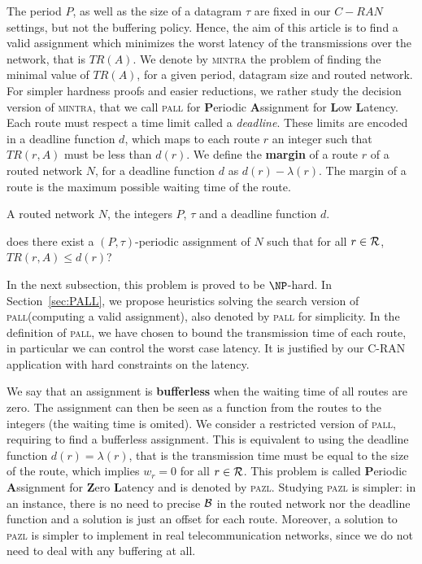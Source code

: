 \documentclass[a4paper,10pt]{article}
\newcommand\pazl{\textsc{pazl}\xspace}
\newcommand\pall{\textsc{pall}\xspace}
\newcommand\pra{\textsc{pra}\xspace}
\newcommand\mintra{\textsc{mintra}\xspace}
\begin{document}
      	The period $P$, as well as the size of a datagram $\tau$ are fixed in our $C-RAN$ settings, but not the buffering policy. Hence, the aim of this article is to find a valid assignment which minimizes the worst latency of the transmissions over the network, that is $TR(A)$. We denote by \mintra the problem of finding the minimal value of $TR(A)$, for a given period, datagram size and routed network.
      	For simpler hardness proofs and easier reductions, we rather study the decision version of \mintra, that we call \pall for \textbf{P}eriodic \textbf{A}ssignment for \textbf{L}ow \textbf{L}atency. Each route must respect a time limit called a \emph{deadline}. These limits are encoded in a deadline function $d$, which maps to each route $r$ an integer such that $TR(r,A)$ must be less than $d(r)$.
      	We define the \textbf{margin} of a route $r$ of a routed network $N$, for a deadline function $d$ as 
        $ d(r) - \lambda(r)$. The margin of a route is the maximum possible waiting time of the route.
         
     

        A routed network $N$, the integers $P$, $\tau$ and a deadline function $d$.
      
       does there exist a $(P,\tau)$-periodic assignment of $N$ such that for all $r \in {\cal R}$, $TR(r,A) \leq d(r)$?

	  In the next subsection, this problem is proved to be $\NP$-hard. In Section~\ref{sec:PALL}, we propose heuristics solving the search version of \pall (computing a valid assignment), also denoted by \pall for simplicity. In the definition of \pall, we have chosen to bound the transmission time of each route, in particular we can control the worst case latency. It is justified by our C-RAN application with hard constraints on the latency. 

	 We say that an assignment is \textbf{bufferless} when the waiting time of all routes are zero.
	 The assignment can then be seen as a function from the routes to the integers (the waiting time is omited). We consider a restricted version of \pall, requiring to find a bufferless assignment. This is equivalent to using the deadline function $d(r) = \lambda(r)$, that is the 
     transmission time must be equal to the size of the route, which implies $w_r = 0$ for all $r \in \cal{R}$. This problem is called \textbf{P}eriodic \textbf{A}ssignment for \textbf{Z}ero \textbf{L}atency and is denoted by \pazl. Studying \pazl is simpler: in an instance, there is no need to precise $\cal{B}$ in the routed network nor the deadline function and a solution is just an offset for each route.  Moreover, a solution to \pazl is simpler to implement in real telecommunication networks, since we do not need to deal with any buffering at all.
\end{document}
